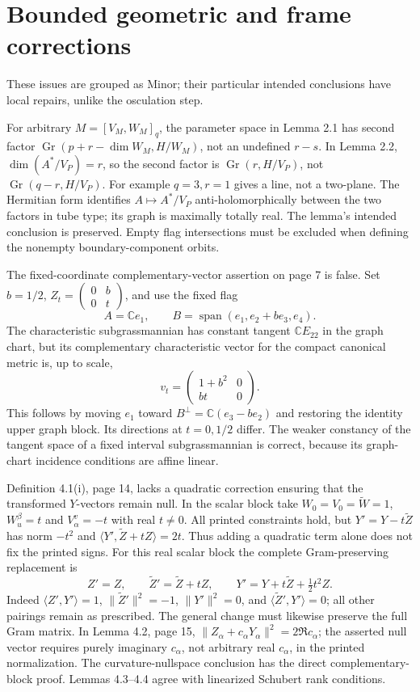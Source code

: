 \documentclass[10pt]{article}
\begin{document}
\section*{Bounded geometric and frame corrections}
These issues are grouped as Minor; their particular intended conclusions have local repairs, unlike the osculation step.\par
For arbitrary \(M=[V_M,W_M]_q\), the parameter space in Lemma 2.1 has second factor \(\operatorname{Gr}(p+r-\dim W_M,H/W_M)\), not an undefined \(r-s\). In Lemma 2.2, \(\dim(A^*/V_P)=r\), so the second factor is \(\operatorname{Gr}(r,H/V_P)\), not \(\operatorname{Gr}(q-r,H/V_P)\). For example \(q=3,r=1\) gives a line, not a two-plane. The Hermitian form identifies \(A\mapsto A^*/V_P\) anti-holomorphically between the two factors in tube type; its graph is maximally totally real. The lemma’s intended conclusion is preserved. Empty flag intersections must be excluded when defining the nonempty boundary-component orbits.\par
The fixed-coordinate complementary-vector assertion on page 7 is false. Set \(b=1/2\), \(Z_t=\left(\begin{smallmatrix}0&b\\0&t\end{smallmatrix}\right)\), and use the fixed flag \[A=\mathbb Ce_1,\qquad B=\operatorname{span}(e_1,e_2+b e_3,e_4).\] The characteristic subgrassmannian has constant tangent \(\mathbb CE_{22}\) in the graph chart, but its complementary characteristic vector for the compact canonical metric is, up to scale, \[v_t=\begin{pmatrix}1+b^2&0\\bt&0\end{pmatrix}.\] This follows by moving \(e_1\) toward \(B^\perp=\mathbb C(e_3-b e_2)\) and restoring the identity upper graph block. Its directions at \(t=0,1/2\) differ. The weaker constancy of the tangent space of a fixed interval subgrassmannian is correct, because its graph-chart incidence conditions are affine linear.\par
Definition 4.1(i), page 14, lacks a quadratic correction ensuring that the transformed \(Y\)-vectors remain null. In the scalar block take \(W_0=V_0=\widetilde W=1\), \(W_u^\beta=t\) and \(V_\alpha^v=-t\) with real \(t\ne0\). All printed constraints hold, but \(Y'=Y-t\widetilde Z\) has norm \(-t^2\) and \(\langle Y',\widetilde Z+tZ\rangle=2t\). Thus adding a quadratic term alone does not fix the printed signs. For this real scalar block the complete Gram-preserving replacement is \[Z'=Z,\qquad \widetilde Z'=\widetilde Z+tZ,\qquad
 Y'=Y+t\widetilde Z+\tfrac12t^2Z .\] Indeed \(\langle Z',Y'\rangle=1\), \(\|\widetilde Z'\|^2=-1\), \(\|Y'\|^2=0\), and \(\langle\widetilde Z',Y'\rangle=0\); all other pairings remain as prescribed. The general change must likewise preserve the full Gram matrix. In Lemma 4.2, page 15, \(\|Z_\alpha+c_\alpha Y_\alpha\|^2=2\Re c_\alpha\); the asserted null vector requires purely imaginary \(c_\alpha\), not arbitrary real \(c_\alpha\), in the printed normalization. The curvature-nullspace conclusion has the direct complementary-block proof. Lemmas 4.3–4.4 agree with linearized Schubert rank conditions.\par
\end{document}
